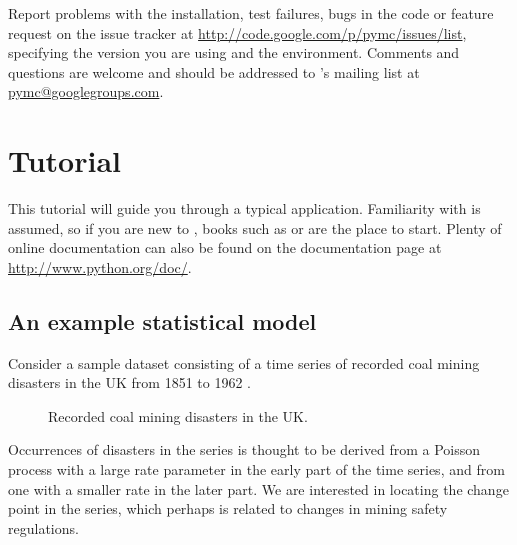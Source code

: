 \documentclass[]{jss}
\begin{document}
Report problems with the installation, test failures, bugs in the code or feature request
on the issue tracker at \href{http://code.google.com/p/pymc/issues/list}{http://code.google.com/p/pymc/issues/list},
specifying the version you are using and the environment. Comments and questions are welcome and should be
addressed to 's mailing list at \href{mailto:pymc@googlegroups.com}{pymc@googlegroups.com}.


\section[Tutorial]{Tutorial}
\label{chap:tutorial}

This tutorial will guide you through a typical  application.
Familiarity with  is assumed, so if you are new to , books such as
\citet{Lutz:2007} or \citet{Langtangen:2009} are the place to start. Plenty of
online documentation can also be found on the  documentation page at  
\href{http://www.python.org/doc/}{http://www.python.org/doc/}.

\subsection{An example statistical model}
Consider a sample dataset consisting of a time series of recorded coal mining
disasters in the UK from 1851 to 1962 \cite[Figure~\ref{fig:disaster-data}, ][]{Jarrett:1979fr}.
\begin{figure}[h!]
\begin{center}
\caption{Recorded coal mining disasters in the UK. }
\label{fig:disaster-data}
\end{center}
\end{figure}
Occurrences of disasters in the series is thought to be derived from a Poisson process with a large rate parameter in the early part of the time series, and from one with a smaller rate in the later part. We are interested in locating the change point in the series, which perhaps is related to changes in mining safety regulations.
\end{document}
